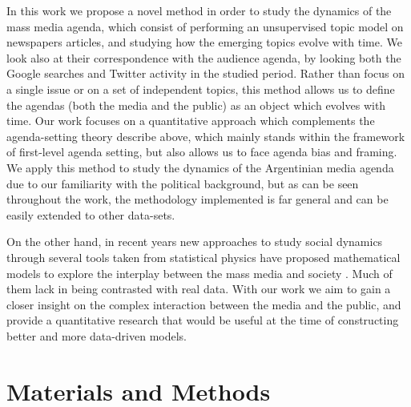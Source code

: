 \documentclass{bmcart}
\begin{document}
\par In this work we propose a novel method in order to study the dynamics of the mass media agenda, which consist of performing an unsupervised topic model on newspapers articles, and studying how the emerging topics evolve with time. 
We look also at their correspondence with the audience agenda, by looking both the Google searches and Twitter activity in the studied period. 
Rather than focus on a single issue or on a set of independent topics, this method allows us to define  the agendas (both the media and the public) as an object which evolves with time.
Our work focuses on a quantitative approach which complements the agenda-setting theory describe above, which mainly stands within the framework of first-level agenda setting, but also allows us to face agenda bias and framing.
We apply this method to study the dynamics of the Argentinian media agenda due to our familiarity with the political background, but as can be seen throughout the work, the methodology implemented is far general and can be easily extended to other data-sets. 



\par On the other hand, in recent years new approaches to study social dynamics through several tools taken from statistical physics have proposed mathematical models to explore the interplay between the mass media and society \cite{crokidakis2012effects,gonzalez2012model, moussaid2013opinion, rodriguez2010effects, pinto2016setting}. Much of them lack in being contrasted with real data. 
With our work we aim to gain a closer insight on the complex interaction between the media and the public, and provide a quantitative research that would be useful at the time of constructing better and more data-driven models.

\section*{Materials and Methods}
 \label{sec:MatMeth}
\end{document}

